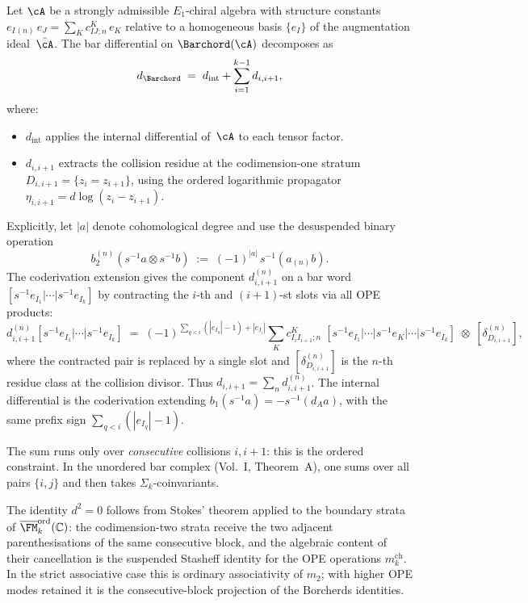 \begin{construction}
\label{constr:bar-diff-collision}
Let $\cA$ be a strongly admissible $E_1$-chiral algebra with
structure constants $e_I{}_{(n)}\,e_J=\sum_K c^K_{IJ;n}\,e_K$
relative to a homogeneous basis $\{e_I\}$ of the
augmentation ideal~$\bar\cA$. The bar differential on
$\Barchord(\cA)$ decomposes as
\[
d_{\Barchord}
\;=\;
d_{\mathrm{int}}+\sum_{i=1}^{k-1} d_{i,i+1},
\]
where:
\begin{itemize}
\item $d_{\mathrm{int}}$ applies the internal differential
 of~$\cA$ to each tensor factor.
\item $d_{i,i+1}$ extracts the collision residue at the
 codimension-one stratum $D_{i,i+1}=\{z_i=z_{i+1}\}$,
 using the ordered logarithmic propagator
 $\eta_{i,i+1}=d\log(z_i-z_{i+1})$.
\end{itemize}

Explicitly, let $|a|$ denote cohomological degree and use the
desuspended binary operation
\[
b_2^{(n)}(s^{-1}a\otimes s^{-1}b)
\;:=\;
(-1)^{|a|}\,s^{-1}(a_{(n)}b).
\]
The coderivation extension gives the component $d_{i,i+1}^{(n)}$
on a bar word
$[s^{-1}e_{I_1}|\cdots|s^{-1}e_{I_k}]$ by contracting
the $i$-th and $(i{+}1)$-st slots via all OPE products:
\[
d_{i,i+1}^{(n)}
[s^{-1}e_{I_1}|\cdots|s^{-1}e_{I_k}]
\;=\;
(-1)^{\sum_{q<i}(|e_{I_q}|-1)+|e_{I_i}|}
\sum_K c^K_{I_i I_{i+1};n}\;
[s^{-1}e_{I_1}|\cdots|s^{-1}e_K|\cdots|s^{-1}e_{I_k}]
\;\otimes\;[\delta_{D_{i,i+1}}^{(n)}],
\]
where the contracted pair is replaced by a single slot and
$[\delta_{D_{i,i+1}}^{(n)}]$ is the $n$-th residue class at the
collision divisor.
Thus $d_{i,i+1}=\sum_n d_{i,i+1}^{(n)}$. The internal
differential is the coderivation extending
$b_1(s^{-1}a)=-s^{-1}(d_Aa)$, with the same
prefix sign $\sum_{q<i}(|e_{I_q}|-1)$.

The sum runs only over \emph{consecutive} collisions
$i,i{+}1$: this is the ordered constraint. In the unordered
bar complex (Vol.~I, Theorem~A), one sums over all pairs
$\{i,j\}$ and then takes $\Sigma_k$-coinvariants.

The identity $d^2=0$ follows from Stokes' theorem applied
to the boundary strata of
$\overline{\FM}_k^{\mathrm{ord}}(\mathbb C)$: the
codimension-two strata receive the two adjacent parenthesisations of
the same consecutive block, and the algebraic content of their
cancellation is the suspended Stasheff identity for the OPE operations
$m_k^{\mathrm{ch}}$. In the strict associative case this is ordinary
associativity of $m_2$; with higher OPE modes retained it is the
consecutive-block projection of the Borcherds identities.
\end{construction}

